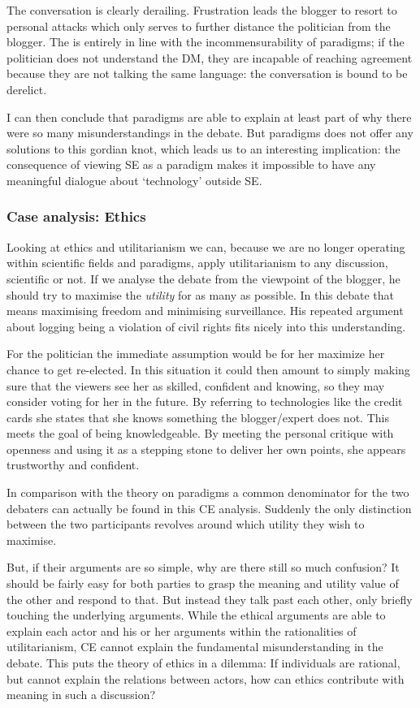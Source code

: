\documentclass{article}
\begin{document}
The conversation is clearly derailing. Frustration leads the blogger to resort to personal attacks which only serves to further distance the politician from the blogger. The is entirely in line with the incommensurability of paradigms; if the politician does not understand the DM, they are incapable of reaching agreement because they are not talking the same language: the conversation is bound to be derelict. 

I can then conclude that paradigms are able to explain at least part of why there were so many misunderstandings in the debate. But paradigms does not offer any solutions to this gordian knot, which leads us to an interesting implication: the consequence of viewing SE as a paradigm makes it impossible to have any meaningful dialogue about `technology' outside SE.

\subsubsection{Case analysis: Ethics}
Looking at ethics and utilitarianism we can, because we are no longer operating within scientific fields and paradigms, apply utilitarianism to any discussion, scientific or not.
If we analyse the debate from the viewpoint of the blogger, he should try to maximise the \textit{utility} for as many as possible. In this debate that means maximising freedom and minimising surveillance. His repeated argument about logging being a violation of civil rights fits nicely into this understanding.

For the politician the immediate assumption would be for her maximize her chance to get re-elected. In this situation it could then amount to simply making sure that the viewers see her as skilled, confident and knowing, so they may consider voting for her in the future. By referring to technologies like the credit cards she states that she knows something the blogger/expert does not. This meets the goal of being knowledgeable. By meeting the personal critique with openness and using it as a stepping stone to deliver her own points, she appears trustworthy and confident.

In comparison with the theory on paradigms a common denominator for the two debaters can actually be found in this CE analysis. Suddenly the only distinction between the two participants revolves around which utility they wish to maximise. 

But, if their arguments are so simple, why are there still so much confusion? It should be fairly easy for both parties to grasp the meaning and utility value of the other and respond to that. But instead they talk past each other, only briefly touching the underlying arguments. While the ethical arguments are able to explain each actor and his or her arguments within the rationalities of utilitarianism, CE cannot explain the fundamental misunderstanding in the debate. This puts the theory of ethics in a dilemma: If individuals are rational, but cannot explain the relations between actors, how can ethics contribute with meaning in such a discussion?
\end{document}
